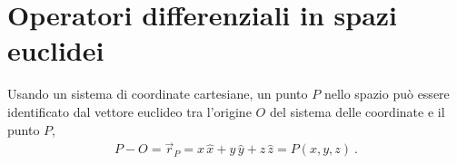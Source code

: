 \documentclass[letterpaper,10pt,italian]{jupyterBook}
\begin{document}
\section{Operatori differenziali in spazi euclidei}
\label{\detokenize{ch/vector-calculus/derivatives:operatori-differenziali-in-spazi-euclidei}}\label{\detokenize{ch/vector-calculus/derivatives:vector-calculus-derivatives}}\label{\detokenize{ch/vector-calculus/derivatives::doc}}
\sphinxAtStartPar
Usando un sistema di coordinate cartesiane, un punto \(P\) nello spazio può essere identificato dal vettore euclideo tra l’origine \(O\) del sistema delle coordinate e il punto \(P\),
\begin{equation*}
\begin{split}P - O = \vec{r}_P = x \, \hat{x} + y \, \hat{y} + z \, \hat{z}  = P(x,y,z) \ .\end{split}
\end{equation*}
\end{document}
